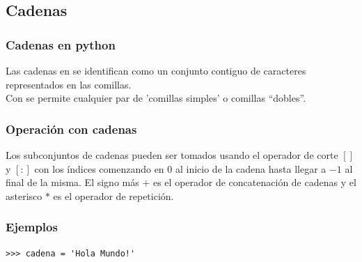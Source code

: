 {\subsection{Cadenas}
\begin{frame}
\frametitle{Cadenas en python}
Las cadenas en \python{} se identifican como un conjunto contiguo de caracteres representados en las comillas.
\\
\bigskip
Con \python{} se permite cualquier par de 'comillas simples' o comillas \enquote{dobles}.
\end{frame}
\begin{frame}
\frametitle{Operación con cadenas}
Los subconjuntos de cadenas pueden ser tomados usando el operador de corte $[]$ y $[:]$ con los índices comenzando en $0$ al inicio de la cadena hasta llegar a $-1$ al final de la misma.
\pause
El signo más $+$ es el operador de concatenación de cadenas y el asterisco $*$ es el operador de repetición.
\end{frame}
\begin{frame}[fragile]
\frametitle{Ejemplos}
\begin{verbatim}
>>> cadena = 'Hola Mundo!'


\end{verbatim}
\end{frame}}
